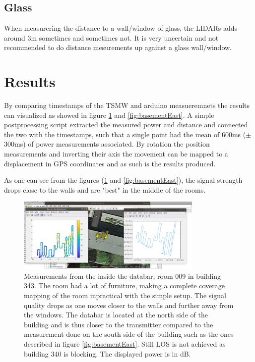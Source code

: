 \documentclass[a4paper,twoside, 12pt]{article}
\begin{document}
\subsection{Glass}
When measurering the distance to a wall/window of glass, the LIDARs adds around 3m sometimes and sometimes not. It is very uncertain and not recommended to do distance mesurements up against a glass wall/window.




\section{Results}
By comparing timestamps of the TSMW and arduino measueremnets the results can visualized as showed in figure \ref{fig:databar} and \ref{fig:basementEast}. A simple postprocessing script extracted the measured power and distance and connected the two with the timestamps, such that a single point had the mean of 600ms ($\pm$ 300ms) of power measurements associated. By rotation the position measurements and inverting their axis the movement can be mapped to a displacement in GPS coordinates and as such is the results produced.

As one can see from the figures (\ref{fig:databar} and \ref{fig:basementEast}), the signal strength drops close to the walls and are "best" in the middle of the rooms. 

\begin{figure}[ht]
\centering
\includegraphics[width=0.8\textwidth]{databar.png}
\caption{Measurements from the inside the databar, room 009 in building 343. The room had a lot of furniture, making a complete coverage mapping of the room inpractical with the simple setup. The signal quality drops as one moves closer to the walls and further away from the windows. The databar is located at the north side of the building and is thus closer to the transmitter compared to the measurement done on the south side of the building such as the ones described in figure \ref{fig:basementEast}. Still LOS is not achieved as building 340 is blocking. The displayed power is in dB.}
\label{fig:databar}
\end{figure}
\end{document}
